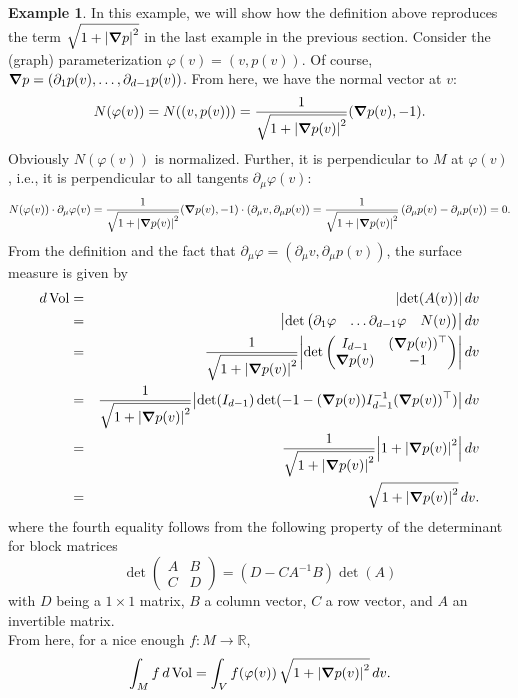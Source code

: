 \documentclass{article}
\theoremstyle{definition}
\newtheorem{exmp}{Example}[section]
\renewcommand\det{\operatorname{det}}
\newcommand{\p}{\partial}
\newcommand{\R}{\mathbb{R}}
\newcommand{\lp}{\left(}
\newcommand{\rp}{\right)}
\theoremstyle{theorem}
\newcommand{\Vol}{\operatorname{Vol}}
\begin{document}
\begin{exmp}
In this example, we will show how the definition above reproduces the term $\sqrt{1 + \abs{\grad p}^2}$ in the last example in the previous section. Consider the (graph) parameterization $\varphi(v) = (v,p(v))$. Of course, $\grad p  = (\p_1 p(v),\dots,\p_{d-1} p(v))$. From here, we have the normal vector at $v$:
\begin{equation*}
    N(\varphi(v)) = N((v,p(v))) = \frac{1}{\sqrt{1+ \abs{\grad p(v)}^2}} (\grad p(v), -1).
\end{equation*}
Obviously $N(\varphi(v))$ is normalized. Further, it is perpendicular to $M$ at $\varphi(v)$, i.e., it is perpendicular to all tangents $\p_\mu\varphi(v)$: 
\begin{equation*}
    N(\varphi(v))\cdot \p_\mu \varphi(v) = \frac{1}{\sqrt{1+ \abs{\grad p(v)}^2}} ( \grad p(v), -1 ) \cdot ( \p_\mu v, \p_\mu p(v) ) = \frac{1}{\sqrt{1+ \abs{\grad p(v)}^2}}\lp \p_\mu p(v) - \p_\mu p(v) \rp = 0.
\end{equation*}
From the definition and the fact that $\p_\mu \varphi = (\p_\mu v, \p_\mu p(v))$, the surface measure is given by 
\begin{eqnarray*}
    d\Vol &=& \abs{\det(A(v))}\,dv \\ 
    &=& \abs{\det
    \begin{pmatrix}
    \p_1\varphi & \dots \p_{d-1}\varphi & N(v)
    \end{pmatrix}
    } \,dv\\
    &=& \frac{1}{\sqrt{1+ \abs{\grad p(v)}^2}} \abs{\det
    \begin{pmatrix}
    I_{d-1} & (\grad p(v))^\top \\
    \grad p(v) & -1
    \end{pmatrix}
    }\,dv \\
    &=& \frac{1}{\sqrt{1+ \abs{\grad p(v)}^2}} \abs{\det(I_{d-1})\det(-1 - (\grad p(v))I_{d-1}^{-1} (\grad p(v))^\top)}\,dv \\ 
    &=& \frac{1}{\sqrt{1+ \abs{\grad p(v)}^2}} \abs{1 + \abs{\grad p(v)}^2 }\,dv \\
    &=& \sqrt{1+ \abs{\grad p(v)}^2} \,dv.
\end{eqnarray*}
where the fourth equality follows from the following property of the determinant for block matrices
\begin{equation*}
    \det\begin{pmatrix}
    A & B \\ C & D
    \end{pmatrix}
    = (D - CA^{-1}B)\det(A)
\end{equation*}
with $D$ being a $1\times 1$ matrix, $B$ a column vector, $C$ a row vector, and $A$ an invertible matrix. \\

From here, for a nice enough $f:M\to \R$, 
\begin{equation*}
    \int_M f\,d\Vol = \int_V f(\varphi(v))\, \sqrt{1+ \abs{\grad p(v)}^2}\,dv.
\end{equation*}
\end{exmp}
\end{document}
